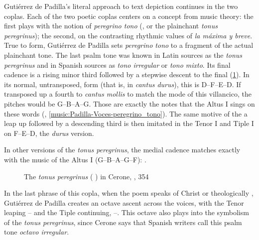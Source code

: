 Gutiérrez de Padilla's literal approach to text depiction continues in the two
coplas.
Each of the two poetic coplas centers on a concept from music theory: the first
plays with the notion of \emph{peregrino tono} (, or the
plainchant \emph{tonus peregrinus}); the second, on the contrasting rhythmic
values of \emph{la máxima y breve}.
True to form, Gutiérrez de Padilla sets \emph{peregrino tono} to a fragment of
the actual plainchant tone.
The last psalm tone was known in Latin sources as the \emph{tonus peregrinus}
and in Spanish sources as \emph{tono irregular} or \emph{tono mixto}.
Its final cadence is a rising minor third followed by a stepwise descent to the
final (\cref{fig:Cerone-tonus_peregrinus}).%
    \Autocite[354]{Cerone:Melopeo}
In its normal, untransposed, form (that is, in \emph{cantus durus}), this is
D--F--E--D.
If transposed up a fourth to \emph{cantus mollis} to match the mode of this
villancico, the pitches would be G--B\fl{}--A--G. 
Those are exactly the notes that the Altus I sings on these words
(, \cref{music:Padilla-Voces-peregrino_tono}).
The same motive of the a leap up followed by a descending third is then imitated
in the Tenor I and Tiple I on F--E--D, the \emph{durus} version.%
\begin{Footnote}
    In other versions of the \emph{tonus peregrinus}, the medial cadence matches
    exactly with the music of the Altus I (G--B\fl{}--A--G--F):
    \autocite[160]{Catholic:LiberUsualis1956}.
\end{Footnote}

\begin{figure}
    \caption{The \emph{tonus peregrinus} (
    ) in Cerone, , 354}

    \label{fig:Cerone-tonus_peregrinus}
\end{figure}

\begin{musicexample}
    \caption{Gutiérrez de Padilla, , copla 1
    (): Point of imitation quoting cadences chant \emph{tonus
    peregrinus} on words \emph{peregrino tono}}

    \label{music:Padilla-Voces-peregrino_tono}
\end{musicexample}

In the last phrase of this copla, when the poem speaks of Christ  or theologically , Gutiérrez
de Padilla creates an octave ascent across the voices, with the Tenor leaping
-- and the Tiple continuing, --.
This octave also plays into the symbolism of the \emph{tonus peregrinus}, since
Cerone says that Spanish writers call this  psalm tone
\emph{octavo irregular}.%
    \Autocite[354]{Cerone:Melopeo}

